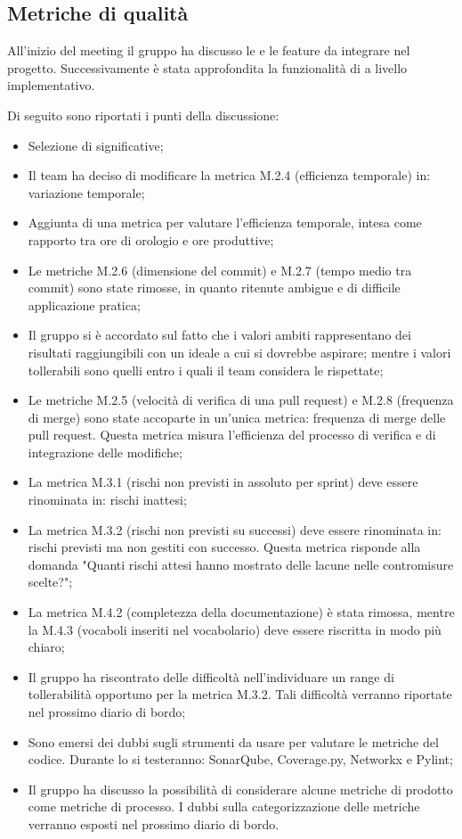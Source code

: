 \subsection{Metriche di qualità}
\par All'inizio del meeting il gruppo ha discusso le  e le feature da integrare nel progetto. Successivamente è stata approfondita la funzionalità di  a livello implementativo.
\par Di seguito sono riportati i punti della discussione:
\begin{itemize}
	\item Selezione di  significative;
	\item Il team ha deciso di modificare la metrica M.2.4 (efficienza temporale) in: variazione temporale;
	\item Aggiunta di una metrica per valutare l'efficienza temporale, intesa come rapporto tra ore di orologio e ore produttive;
	\item Le metriche M.2.6 (dimensione del commit) e M.2.7 (tempo medio tra commit) sono state rimosse, in quanto ritenute ambigue e di difficile applicazione pratica;
	\item Il gruppo si è accordato sul fatto che i valori ambiti rappresentano dei risultati raggiungibili con un \glossario{\WoW} ideale a cui si dovrebbe aspirare; mentre i valori tollerabili sono quelli entro i quali il team considera le  rispettate;
	\item Le metriche M.2.5 (velocità di verifica di una pull request) e M.2.8 (frequenza di merge) sono state accoparte in un'unica metrica: frequenza di merge delle pull request. Questa metrica misura l'efficienza del processo di verifica e di integrazione delle modifiche;
	\item La metrica M.3.1 (rischi non previsti in assoluto per sprint) deve essere rinominata in: rischi inattesi;
	\item La metrica M.3.2 (rischi non previsti su successi) deve essere rinominata in: rischi previsti ma non gestiti con successo. Questa metrica risponde alla domanda "Quanti rischi attesi hanno mostrato delle lacune nelle contromisure scelte?";
	\item La metrica M.4.2 (completezza della documentazione) è stata rimossa, mentre la M.4.3 (vocaboli inseriti nel vocabolario) deve essere riscritta in modo più chiaro;
	\item Il gruppo ha riscontrato delle difficoltà nell'individuare un range di tollerabilità opportuno per la metrica M.3.2. Tali difficoltà verranno riportate nel prossimo diario di bordo;
	\item Sono emersi dei dubbi sugli strumenti da usare per valutare le metriche del codice. Durante lo  si testeranno: SonarQube, Coverage.py, Networkx e Pylint;
	\item Il gruppo ha discusso la possibilità di considerare alcune metriche di prodotto come metriche di processo. I dubbi sulla categorizzazione delle metriche verranno esposti nel prossimo diario di bordo.
\end{itemize}

